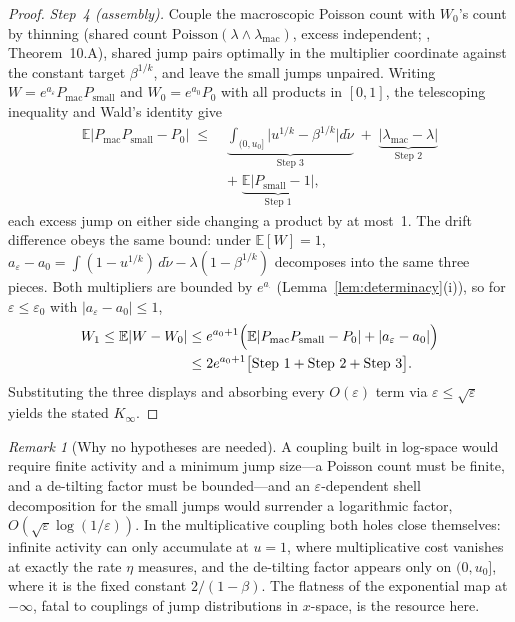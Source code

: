 \documentclass[12pt]{amsart}
\theoremstyle{definition}
\theoremstyle{remark}
\newtheorem*{remark}{Remark}
\begin{document}
\begin{proof}
\textit{Step~4 (assembly).}  Couple the macroscopic Poisson count
with $W_0$'s count by thinning (shared count
$\mathrm{Poisson}(\lambda\wedge\lambda_{\mathrm{mac}})$, excess
independent; \cite{BHJ92}, Theorem~10.A), shared jump pairs
optimally in the multiplier coordinate against the constant target
$\beta^{1/k}$, and leave the small jumps unpaired.  Writing $W =
e^{a_\varepsilon}P_{\mathrm{mac}}P_{\mathrm{small}}$ and $W_0 =
e^{a_0}P_0$ with all products in $[0,1]$, the telescoping inequality
and Wald's identity give
\[
\begin{aligned}
  \mathbb{E}\bigl|P_{\mathrm{mac}}P_{\mathrm{small}} - P_0\bigr|
  \;\le\;
  &\underbrace{\int_{(0,u_0]}\!\bigl|u^{1/k}-\beta^{1/k}\bigr|
  d\tilde\nu}_{\text{Step 3}}
  \;+\;
  \underbrace{\bigl|\lambda_{\mathrm{mac}} -
  \lambda\bigr|}_{\text{Step 2}}\\
  &+\;
  \underbrace{\mathbb{E}\bigl|P_{\mathrm{small}} -
  1\bigr|}_{\text{Step 1}},
\end{aligned}
\]
each excess jump on either side changing a product by at most~1.
The drift difference obeys the same bound: under $\mathbb{E}[W]=1$,
$a_\varepsilon - a_0 = \int(1-u^{1/k})\,d\tilde\nu -
\lambda(1-\beta^{1/k})$ decomposes into the same three pieces.  Both
multipliers are bounded by $e^{a_\cdot}$
(Lemma~\ref{lem:determinacy}(i)), so for $\varepsilon \le
\varepsilon_0$ with $|a_\varepsilon - a_0| \le 1$,
\[
\begin{aligned}
  W_1 \le \mathbb{E}|W - W_0|
  &\le e^{a_0+1}\Bigl(\mathbb{E}|P_{\mathrm{mac}}P_{\mathrm{small}}
  - P_0| + |a_\varepsilon - a_0|\Bigr)\\
  &\le 2e^{a_0+1}\bigl[\text{Step 1} + \text{Step 2} +
  \text{Step 3}\bigr].
\end{aligned}
\]
Substituting the three displays and absorbing every
$O(\varepsilon)$ term via $\varepsilon \le \sqrt\varepsilon$ yields
the stated $K_\infty$.
\end{proof}

\begin{remark}[Why no hypotheses are needed]
A coupling built in log-space would require finite activity and a
minimum jump size---a Poisson count must be finite, and a de-tilting
factor must be bounded---and an $\varepsilon$-dependent shell
decomposition for the small jumps would surrender a logarithmic
factor, $O(\sqrt\varepsilon\log(1/\varepsilon))$.  In the
multiplicative coupling both holes close themselves: infinite
activity can only accumulate at $u = 1$, where multiplicative cost
vanishes at exactly the rate $\eta$ measures, and the de-tilting
factor appears only on $(0,u_0]$, where it is the fixed constant
$2/(1-\beta)$.  The flatness of the exponential map at $-\infty$,
fatal to couplings of jump distributions in $x$-space, is the
resource here.
\end{remark}
\end{document}

